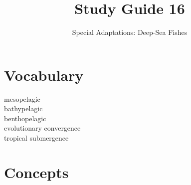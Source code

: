 \documentclass[letterpaper]{tufte-handout}
\title{Study Guide 16}
\author{Special Adaptations: Deep-Sea Fishes}
\date{} %
\begin{document}
\maketitle	%


\section{Vocabulary} 
\vspace{-1\baselineskip}
\begin{multicols}{2}
mesopelagic \\
bathypelagic \\
benthopelagic \\
evolutionary convergence \\
tropical submergence
\end{multicols}

\section{Concepts}
\end{document}
